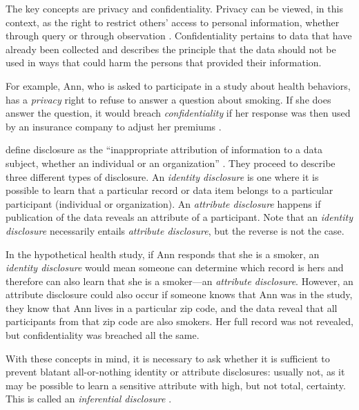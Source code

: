 The key concepts are privacy and confidentiality. Privacy can be viewed, in this context, as the right to restrict others' access to personal information, whether through query or through observation \citep{hirshleifer_privacy_1980}. Confidentiality pertains to data that have already been collected and describes the principle that the data should not be used in ways that could harm the persons that provided their information.

\begin{bboxfix}
For example, Ann, who is asked to participate in a study about health
behaviors, has a \emph{privacy} right to refuse to answer a question
about smoking. If she does answer the question, it would breach
\emph{confidentiality} if her response was then used by an insurance
company to adjust her premiums \citep{duncan_private_1993}.
\end{bboxfix}

\citet{harris-kojetin_statistical_2005} define disclosure as the ``inappropriate attribution of information to a data subject, whether an individual or an organization'' \citep[p.~4]{harris-kojetin_statistical_2005}. They proceed to describe three different types of disclosure. An \emph{identity disclosure} is one where it is possible to learn that a particular record or data item belongs to a particular participant (individual or organization). An \emph{attribute disclosure} happens if publication of the data reveals an attribute of a participant. Note that an \emph{identity disclosure} necessarily entails \emph{attribute disclosure}, but the reverse is not the case.

\begin{bboxfix}
In the hypothetical health study, if Ann responds that she is a smoker,
an \emph{identity disclosure} would mean someone can determine which
record is hers and therefore can also learn that she is a smoker---an
\emph{attribute disclosure}. However, an attribute disclosure could also
occur if someone knows that Ann was in the study, they know that Ann
lives in a particular zip code, and the data reveal that all
participants from that zip code are also smokers. Her full record was
not revealed, but confidentiality was breached all the same.
\end{bboxfix}

With these concepts in mind, it is necessary to ask whether it is sufficient to prevent blatant all-or-nothing identity or attribute disclosures: usually not, as it may be possible to learn a sensitive attribute with high, but not total, certainty. This is called an \emph{inferential disclosure} \citep{dalenius_towards_1977, duncan_disclosure-limited_1986}.

